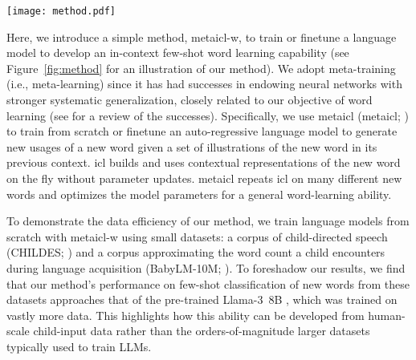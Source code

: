 \documentclass{article}
\begin{document}
\begin{figure*}[t]
\centering
\texttt{[image: method.pdf]}
\caption{Illustration of \ac{metaicl-w} (top) and language modeling (bottom), which can be mixed together during training such that both contribute to model updates. Each meta-learning episode in \ac{metaicl-w} aims to learn a \textcolor[RGB]{48,111,28}{new word} from a set of study examples (sentences that use the word) in the context and then generate a generalization example that also uses the word. Each language modeling episode contains a set of unrelated sentences without meta-learned words. An episode will be converted into a single sequence in which we replace the word to be learned (if it is a meta-learning episode) with a special placeholder token (e.g., \textcolor[RGB]{226,121,46}{\texttt{[new-token]}}) and concatenate/wrap the sentences with another special separator token (e.g., \texttt{<sep>}). We do gradient updates of the model parameters to optimize the next-token prediction loss on the sequence.}
\label{fig:method}
\end{figure*}

Here, we introduce a simple method, \acf{metaicl-w}, to train or finetune a language model to develop an in-context few-shot word learning capability (see Figure~\ref{fig:method} for an illustration of our method).
We adopt meta-training (i.e., meta-learning) since it has had successes in endowing neural networks with stronger systematic generalization, closely related to our objective of word learning (see \citealp{Russin2024Frege} for a review of the successes).
Specifically, we use \acl{metaicl} (\acs{metaicl}; \citealp{min-etal-2022-metaicl,chen-etal-2022-meta}) to train from scratch or finetune an auto-regressive language model to generate new usages of a new word given a set of illustrations of the new word in its previous context. \Acf{icl} builds and uses contextual representations of the new word on the fly without parameter updates. \acs{metaicl} repeats \ac{icl} on many different new words and optimizes the model parameters for a general word-learning ability.

To demonstrate the data efficiency of our method, we train language models from scratch with \ac{metaicl-w} using small datasets: a corpus of child-directed speech (CHILDES; \citealp{CHILDES}) and a corpus approximating the word count a child encounters during language acquisition (BabyLM-10M; \citealp{BabyLM}).
To foreshadow our results, we find that our method's performance on few-shot classification of new words from these datasets approaches that of the pre-trained \mbox{Llama-3 8B} \citep{Llama-3}, which was trained on vastly more data. This highlights how this ability can be developed from human-scale child-input data rather than the orders-of-magnitude larger datasets typically used to train LLMs.
\end{document}
